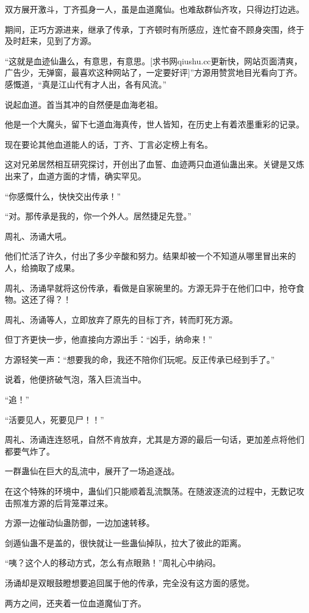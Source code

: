 \begin{this_body}
双方展开激斗，丁齐孤身一人，虽是血道魔仙。也难敌群仙齐攻，只得边打边逃。

期间，正巧方源进来，继承了传承，丁齐顿时有所感应，连忙奋不顾身突围，终于及时赶来，见到了方源。

“这就是血迹仙蛊么，有意思，有意思。[求书网qiushu.cc更新快，网站页面清爽，广告少，无弹窗，最喜欢这种网站了，一定要好评]”方源用赞赏地目光看向丁齐。感慨道，“真是江山代有才人出，各有风流。”

说起血道。首当其冲的自然便是血海老祖。

他是一个大魔头，留下七道血海真传，世人皆知，在历史上有着浓墨重彩的记录。

现在要论其他血道能人的话，丁齐、丁言必定榜上有名。

这对兄弟居然相互研究探讨，开创出了血誓、血迹两只血道仙蛊出来。关键是又炼出来了，血道方面的才情，确实罕见。

“你感慨什么，快快交出传承！”

“对。那传承是我的，你一个外人。居然捷足先登。”

周礼、汤诵大吼。

他们忙活了许久，付出了多少辛酸和努力。结果却被一个不知道从哪里冒出来的人，给摘取了成果。

周礼、汤诵早就将这份传承，看做是自家碗里的。方源无异于在他们口中，抢夺食物。这还了得？！

周礼、汤诵等人，立即放弃了原先的目标丁齐，转而盯死方源。

但丁齐更快一步，他直接向方源出手：“凶手，纳命来！”

方源轻笑一声：“想要我的命，我还不陪你们玩呢。反正传承已经到手了。”

说着，他便挤破气泡，落入巨流当中。

“追！”

“活要见人，死要见尸！！”

周礼、汤诵连连怒吼，自然不肯放弃，尤其是方源的最后一句话，更加差点将他们都要气炸了。

一群蛊仙在巨大的乱流中，展开了一场追逐战。

在这个特殊的环境中，蛊仙们只能顺着乱流飘荡。在随波逐流的过程中，无数记攻击照准方源的后背笼罩过来。

方源一边催动仙蛊防御，一边加速转移。

剑遁仙蛊不是盖的，很快就让一些蛊仙掉队，拉大了彼此的距离。

“咦？这个人的移动方式，怎么有点眼熟！”周礼心中纳闷。

汤诵却是双眼鼓瞪想要追回属于他的传承，完全没有这方面的感觉。

两方之间，还夹着一位血道魔仙丁齐。


\end{this_body}
